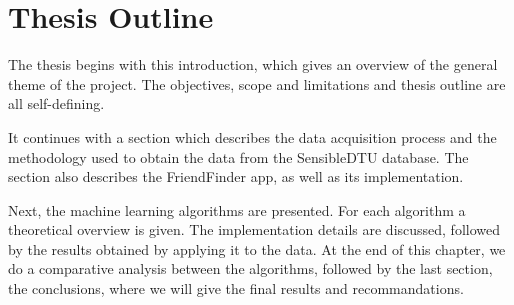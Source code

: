 \section{Thesis Outline}

The thesis begins with this introduction, which gives an overview of the general theme of the project. The objectives, scope and limitations and thesis outline are all self-defining. 

It continues with a section which describes the data acquisition process and the methodology used to obtain the data from the SensibleDTU database. The section also describes the FriendFinder app, as well as its implementation.

Next, the machine learning algorithms are presented. For each algorithm a theoretical overview is given. The implementation details are discussed, followed by the results obtained by applying it to the data. At the end of this chapter, we do a comparative analysis between the algorithms, followed by the last section, the conclusions, where we will give the final results and recommandations.
